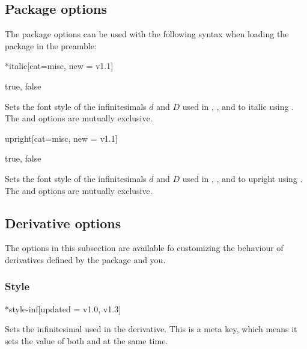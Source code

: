 \subsection{Package options}
The package options can be used with the following syntax when loading the package in the preamble:
\begin{center}
	\ttfamily\small
\end{center}

\begin{option}*{italic}[cat=misc, new = v1.1]
	\begin{values}[default = false]
		true, false
	\end{values}
	Sets the font style of the infinitesimals $d$ and $D$ used in , ,  and  to italic using . The  and  options are mutually exclusive.
\end{option}

\begin{option}{upright}[cat=misc, new = v1.1]
	\begin{values}[default = true]
		true, false
	\end{values}
	Sets the font style of the infinitesimals $d$ and $D$ used in , ,  and  to upright using . The  and  options are mutually exclusive.
\end{option}

\subsection{Derivative options} \label{ssec:options_dv}
The options in this subsection are available fo  customizing the behaviour of derivatives defined by the package and you.%

\subsubsection*{Style}

\begin{option}*{style-inf}[updated = {v1.0, v1.3}]
	\begin{values}[default = ]
	\end{values}
	Sets the infinitesimal used in the derivative. This is a meta key, which means it sets the value of both  and  at the same time.
	\begin{example}
	\end{example}
\end{option}

